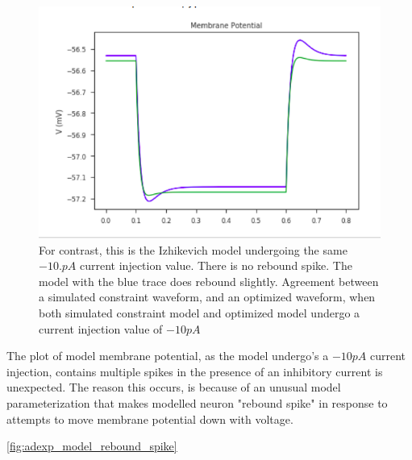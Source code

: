 \begin{figure}
    \begin{center}
    \includegraphics[scale=0.65]{figures/passive_model_agreement}
    \caption{For contrast, this is the Izhikevich model undergoing the same $-10.pA$ current injection value. There is no rebound spike. The model with the blue trace does rebound slightly. Agreement between a simulated constraint waveform, and an optimized waveform, when both simulated constraint model and optimized model undergo a current injection value of $-10pA$}
    \end{center}
    \label{fig:my_label}
\end{figure}

The plot of model membrane potential, as the model undergo's a $-10pA$ current injection, contains multiple spikes in the presence of an inhibitory current is unexpected. The reason this occurs, is because of an unusual model parameterization that makes modelled neuron "rebound spike" in response to attempts to move membrane potential down with voltage.



\ref{fig:adexp_model_rebound_spike}

